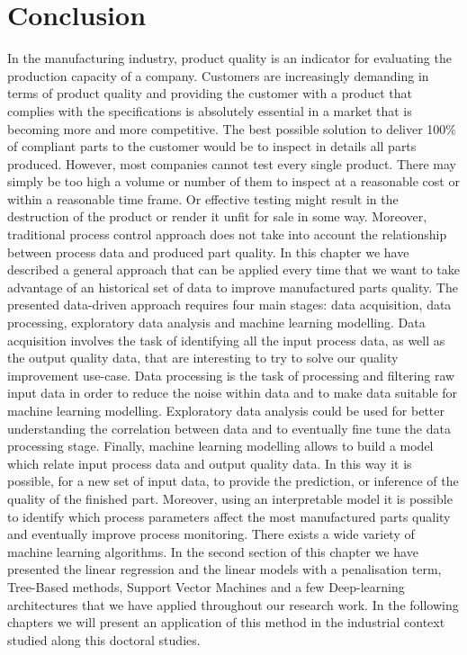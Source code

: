 \section{Conclusion}

In the manufacturing industry, product quality is an indicator for evaluating the production capacity of a company. Customers are increasingly demanding in terms of product quality and providing the customer with a product that complies with the specifications is absolutely essential in a market that is becoming more and more competitive. The best possible solution to deliver 100\% of compliant parts to the customer would be to inspect in details all parts produced. However, most companies cannot test every single product. There may simply be too high a volume or number of them to inspect at a reasonable cost or within a reasonable time frame. Or effective testing might result in the destruction of the product or render it unfit for sale in some way. Moreover, traditional process control approach does not take into account the relationship between process data and produced part quality. In this chapter we have described a general approach that can be applied every time that we want to take advantage of an historical set of data to improve manufactured parts quality. The presented data-driven approach requires four main stages: data acquisition, data processing, exploratory data analysis and machine learning modelling. Data acquisition involves the task of identifying all the input process data, as well as the output quality data, that are interesting to try to solve our quality improvement use-case. Data processing is the task of processing and filtering raw input data in order to reduce the noise within data and to make data suitable for machine learning modelling. Exploratory data analysis could be used for better understanding the correlation between data and to eventually fine tune the data processing stage. Finally, machine learning modelling allows to build a model which relate input process data and output quality data. In this way it is possible, for a new set of input data, to provide the prediction, or inference of the quality of the finished part. Moreover, using an interpretable model it is possible to identify which process parameters affect the most manufactured parts quality and eventually improve process monitoring. There exists a wide variety of machine learning algorithms. In the second section of this chapter we have presented the linear regression and the linear models with a penalisation term, Tree-Based methods, Support Vector Machines and a few Deep-learning architectures that we have applied throughout our research work. In the following chapters we will present an application of this method in the industrial context studied along this doctoral studies.


